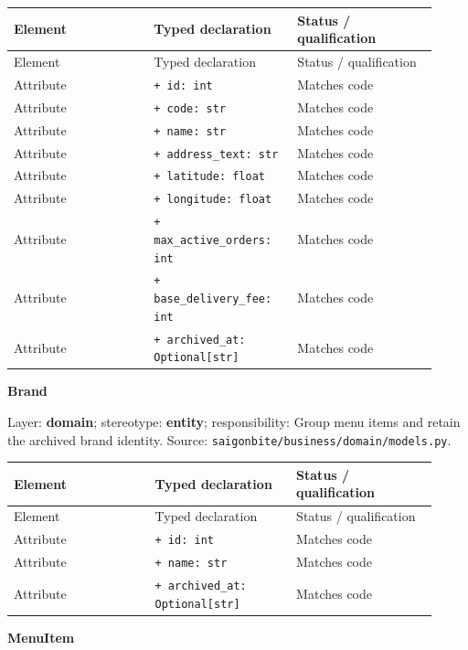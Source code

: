 \begin{longtable}{>{\raggedright\arraybackslash}p{0.3067\linewidth}>{\raggedright\arraybackslash}p{0.3067\linewidth}>{\raggedright\arraybackslash}p{0.3067\linewidth}}
Element & Typed declaration & Status / qualification \\
\hline\endfirsthead
Element & Typed declaration & Status / qualification \\
\hline\endhead
Attribute & \texttt{+ id: int} & Matches code \\
Attribute & \texttt{+ code: str} & Matches code \\
Attribute & \texttt{+ name: str} & Matches code \\
Attribute & \texttt{+ address\_\allowbreak{}text: str} & Matches code \\
Attribute & \texttt{+ latitude: float} & Matches code \\
Attribute & \texttt{+ longitude: float} & Matches code \\
Attribute & \texttt{+ max\_\allowbreak{}active\_\allowbreak{}orders: int} & Matches code \\
Attribute & \texttt{+ base\_\allowbreak{}delivery\_\allowbreak{}fee: int} & Matches code \\
Attribute & \texttt{+ archived\_\allowbreak{}at: Optional[str]} & Matches code \\
\end{longtable}
\textbf{Brand}

Layer: \textbf{domain}; stereotype: \textbf{\guillemotleft{}entity\guillemotright{}}; responsibility: Group menu items and retain the archived brand identity. Source: \texttt{saigonbite/\allowbreak{}business/\allowbreak{}domain/\allowbreak{}models.\allowbreak{}py}.

\begin{longtable}{>{\raggedright\arraybackslash}p{0.3067\linewidth}>{\raggedright\arraybackslash}p{0.3067\linewidth}>{\raggedright\arraybackslash}p{0.3067\linewidth}}
Element & Typed declaration & Status / qualification \\
\hline\endfirsthead
Element & Typed declaration & Status / qualification \\
\hline\endhead
Attribute & \texttt{+ id: int} & Matches code \\
Attribute & \texttt{+ name: str} & Matches code \\
Attribute & \texttt{+ archived\_\allowbreak{}at: Optional[str]} & Matches code \\
\end{longtable}
\textbf{MenuItem}

